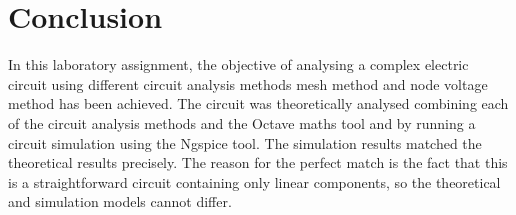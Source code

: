 \section{Conclusion}
\label{sec:conclusion}

In this laboratory assignment, the objective of analysing a complex electric
circuit using different circuit analysis methods mesh method and node voltage
method has been achieved. The circuit was theoretically analysed combining
each of the circuit analysis methods and the Octave maths tool and by running
a circuit simulation using the Ngspice tool. The simulation results matched
the theoretical results precisely. The reason for the
perfect match is the fact that this is a
straightforward circuit containing only linear components, so the theoretical
and simulation models cannot differ.


